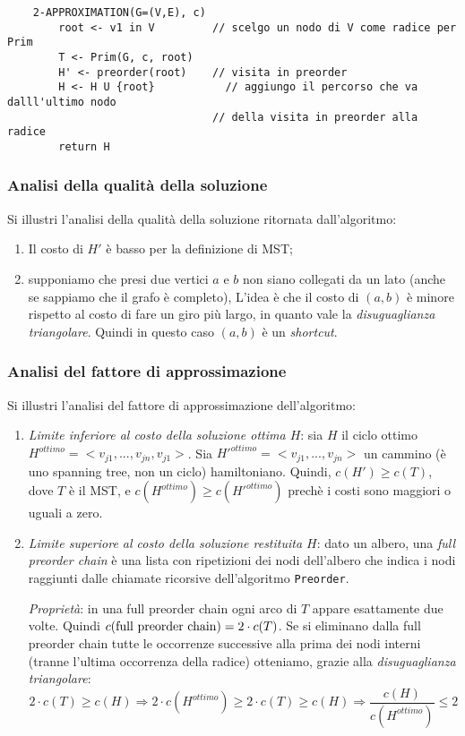 \begin{verbatim}
    2-APPROXIMATION(G=(V,E), c)
        root <- v1 in V         // scelgo un nodo di V come radice per Prim
        T <- Prim(G, c, root)
        H' <- preorder(root)    // visita in preorder
        H <- H U {root}           // aggiungo il percorso che va dalll'ultimo nodo
                                // della visita in preorder alla radice
        return H

\end{verbatim}

\subsubsection{Analisi della qualità della soluzione}

Si illustri l'analisi della qualità della soluzione ritornata dall'algoritmo:
\begin{enumerate}
    \item Il costo di $H'$ è basso per la definizione di MST;
    \item supponiamo che presi due vertici $a$ e $b$ non siano collegati da un lato (anche se
    sappiamo che il grafo è completo), L'idea è che il costo di $(a, b)$ è minore rispetto
    al costo di fare un giro più largo, in quanto vale la \textit{disuguaglianza triangolare}.
    Quindi in questo caso $(a, b)$ è un \textit{shortcut}.
\end{enumerate}

\subsubsection{Analisi del fattore di approssimazione}
Si illustri l'analisi del fattore di approssimazione dell'algoritmo:
\begin{enumerate}
    \item \textit{Limite inferiore al costo della soluzione ottima $H$}: sia $H$ il ciclo
    ottimo $H^{ottimo} = <v_{j1}, ..., v_{jn}, v_{j1}>$.
    Sia $H'^{ottimo} = <v_{j1}, ..., v_{jn}>$ un cammino
    (è uno spanning tree, non un ciclo) hamiltoniano. Quindi, $c(H') \ge c(T)$, dove $T$ è
    il MST, e $c(H^{ottimo}) \ge c(H'^{ottimo})$ prechè i costi sono maggiori o uguali a zero.

    \item \textit{Limite superiore al costo della soluzione restituita $H$}: dato un albero,
    una \textit{full preorder chain} è una lista con ripetizioni dei nodi dell'albero che
    indica i nodi raggiunti dalle chiamate ricorsive dell'algoritmo \verb|Preorder|.

    \textit{Proprietà}: in una full preorder chain ogni arco di $T$ appare esattamente due
    volte. Quindi $c(\textnormal{full preorder chain}) = 2 \cdot c(T)$. Se si eliminano
    dalla full preorder chain tutte le occorrenze successive alla prima dei nodi interni
    (tranne l'ultima occorrenza della radice) otteniamo, grazie alla
    \textit{disuguaglianza triangolare}:
    \[
        2 \cdot c(T) \ge c(H) \Rightarrow 2 \cdot c(H^{ottimo}) \ge 2 \cdot c(T) \ge c(H)
        \Rightarrow \frac{c(H)}{c(H^{ottimo})} \le 2
    \]

\end{enumerate}

